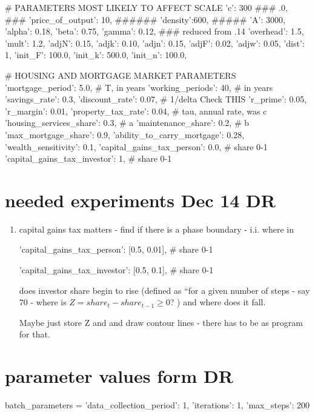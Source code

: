             # PARAMETERS MOST LIKELY TO AFFECT SCALE
            'c': 300                             ### .0,                            ###
            'price_of_output': 10,                 ######
            'density':600,                         #####
            'A': 3000,
            'alpha': 0.18,
            'beta':  0.75,
            'gamma': 0.12, ### reduced from .14
            'overhead': 1.5,
            'mult': 1.2,
            'adjN': 0.15,
            'adjk': 0.10,
            'adjn': 0.15,
'adjF': 0.02,
'adjw': 0.05, 
            'dist': 1, 
            'init_F': 100.0,
            'init_k': 500.0,
            'init_n': 100.0,

            # HOUSING AND MORTGAGE MARKET PARAMETERS
            'mortgage_period': 5.0,       # T, in years
            'working_periods': 40,        # in years
            'savings_rate': 0.3,
'discount_rate': 0.07,        # 1/delta    Check THIS
            'r_prime': 0.05,
'r_margin': 0.01,
            'property_tax_rate': 0.04,     # tau, annual rate, was c
            'housing_services_share': 0.3, # a
            'maintenance_share': 0.2,      # b
'max_mortgage_share': 0.9,
            'ability_to_carry_mortgage': 0.28,
            'wealth_sensitivity': 0.1,
'capital_gains_tax_person':   0.0, # share 0-1
'capital_gains_tax_investor': 1, # share 0-1
 

\section{needed experiments Dec 14 DR}
\begin{enumerate}
    \item capital gains tax matters - find if there is a phase boundary - i.i. where in 

            'capital_gains_tax_person': [0.5, 0.01], # share 0-1

            'capital_gains_tax_investor': [0.5, 0.1], # share 0-1

            does investor share begin to rise (defined as ``for a given number of steps - say 70 - where is $Z=share_t - share_{t-1} \ge 0$? ) and where does it fall.

Maybe just store Z and and draw contour lines - there has to be as program for that.
\end{enumerate}
\section{parameter values form DR}
batch_parameters = {
            'data_collection_period': 1,
            'iterations': 1,
            'max_steps': 200
}

